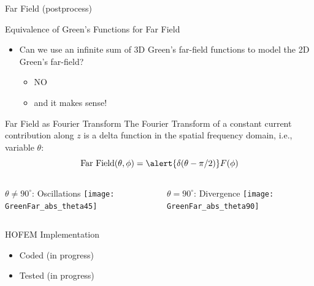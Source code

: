 \begin{frame}[allowframebreaks]{Far Field (postprocess)}

  \begin{block}{Equivalence of Green's Functions for Far Field}
    \begin{itemize}
    \item Can we use an infinite sum of 3D Green's far-field functions
      to model the 2D Green's far-field?
      \begin{itemize}
      \item \alert {NO}
      \item and it makes sense!
      \end{itemize}
    \end{itemize}
  \end{block}
    

  \begin{block}{Far Field as Fourier Transform} 
      The Fourier Transform of a constant current contribution along
      $z$ is a delta function in the spatial frequency domain, i.e.,
      variable $\theta$:
      \begin{equation}
        \text{Far Field}(\theta,\phi) =  \alert{\delta(\theta-\pi/2)}  F(\phi)
      \end{equation}
      
    \end{block}
  
    \framebreak %

    \begin{columns}
       \centering
      \begin{block}{$\theta\ne 90^\circ$: \alert{Oscillations}}
        \texttt{[image: GreenFar\_abs\_theta45]} \\
      \end{block}
      
       \centering
      \begin{block}{$\theta=90^\circ$: \alert{Divergence}}
        \texttt{[image: GreenFar\_abs\_theta90]} \\
      \end{block}
            
    \end{columns}

    \framebreak %

  \begin{block}{HOFEM Implementation}

    \begin{itemize}
    \item  Coded (in progress)
    \item Tested (in progress)
    \end{itemize}
  \end{block}  
    
  \end{frame}


